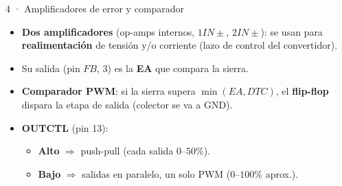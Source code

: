 \documentclass[aspectratio=169]{beamer}
\begin{document}
\begin{frame}{4 · Amplificadores de error y comparador}
  \begin{itemize}
    \item \textbf{Dos amplificadores} (op-amps internos, $1IN\pm$, $2IN\pm$):
      se usan para \textbf{realimentación} de tensión y/o corriente
      (lazo de control del convertidor).
    \item Su salida (pin $FB$, 3) es la \textbf{EA} que compara la sierra.
    \item \textbf{Comparador PWM}: si la sierra supera $\min(EA, DTC)$,
      el \textbf{flip-flop} dispara la etapa de salida (colector se va a GND).
    \item \textbf{OUTCTL} (pin 13):
      \begin{itemize}
        \item \textbf{Alto} $\Rightarrow$ push-pull (cada salida $0$–$50\%$).
        \item \textbf{Bajo} $\Rightarrow$ salidas en paralelo, un solo PWM
          ($0$–$100\%$ aprox.).
      \end{itemize}
  \end{itemize}
\end{frame}
\end{document}
